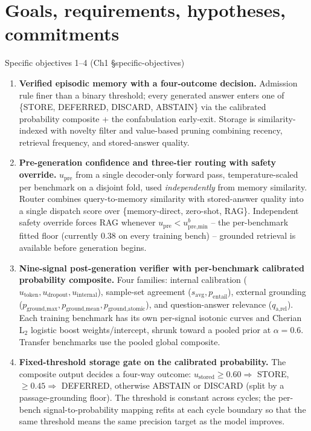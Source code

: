 \documentclass[10pt,aspectratio=169]{beamer}
\begin{document}
\section*{Goals, requirements, hypotheses, commitments}

\begin{frame}{Specific objectives 1--4 (Ch1 \S specific-objectives)}
  \scriptsize
  \begin{enumerate}
    \item \textbf{Verified episodic memory with a four-outcome decision.} Admission rule finer than a binary threshold; every generated answer enters one of \{STORE, DEFERRED, DISCARD, ABSTAIN\} via the calibrated probability composite + the confabulation early-exit. Storage is similarity-indexed with novelty filter and value-based pruning combining recency, retrieval frequency, and stored-answer quality.
    \item \textbf{Pre-generation confidence and three-tier routing with safety override.} $u_{\text{pre}}$ from a single decoder-only forward pass, temperature-scaled per benchmark on a disjoint fold, used \emph{independently} from memory similarity. Router combines query-to-memory similarity with stored-answer quality into a single dispatch score over \{memory-direct, zero-shot, RAG\}. Independent safety override forces RAG whenever $u_{\text{pre}}<u_{\text{pre,min}}^b$ -- the per-benchmark fitted floor (currently $0.38$ on every training bench) -- grounded retrieval is available before generation begins.
    \item \textbf{Nine-signal post-generation verifier with per-benchmark calibrated probability composite.} Four families: internal calibration ($u_{\text{token}}, u_{\text{dropout}}, u_{\text{internal}}$), sample-set agreement ($s_{\text{avg}}, p_{\text{entail}}$), external grounding ($p_{\text{ground,max}}, p_{\text{ground,mean}}, p_{\text{ground,atomic}}$), and question-answer relevance ($q_{\text{a,rel}}$). Each training benchmark has its own per-signal isotonic curves and Cherian L$_2$ logistic boost weights/intercept, shrunk toward a pooled prior at $\alpha{=}0.6$. Transfer benchmarks use the pooled global composite.
    \item \textbf{Fixed-threshold storage gate on the calibrated probability.} The composite output decides a four-way outcome: $u_{\text{stored}} \ge 0.60 \Rightarrow$ STORE, $\ge 0.45 \Rightarrow$ DEFERRED, otherwise ABSTAIN or DISCARD (split by a passage-grounding floor). The threshold is constant across cycles; the per-bench signal-to-probability mapping refits at each cycle boundary so that the same threshold means the same precision target as the model improves.
  \end{enumerate}
\end{frame}
\end{document}
